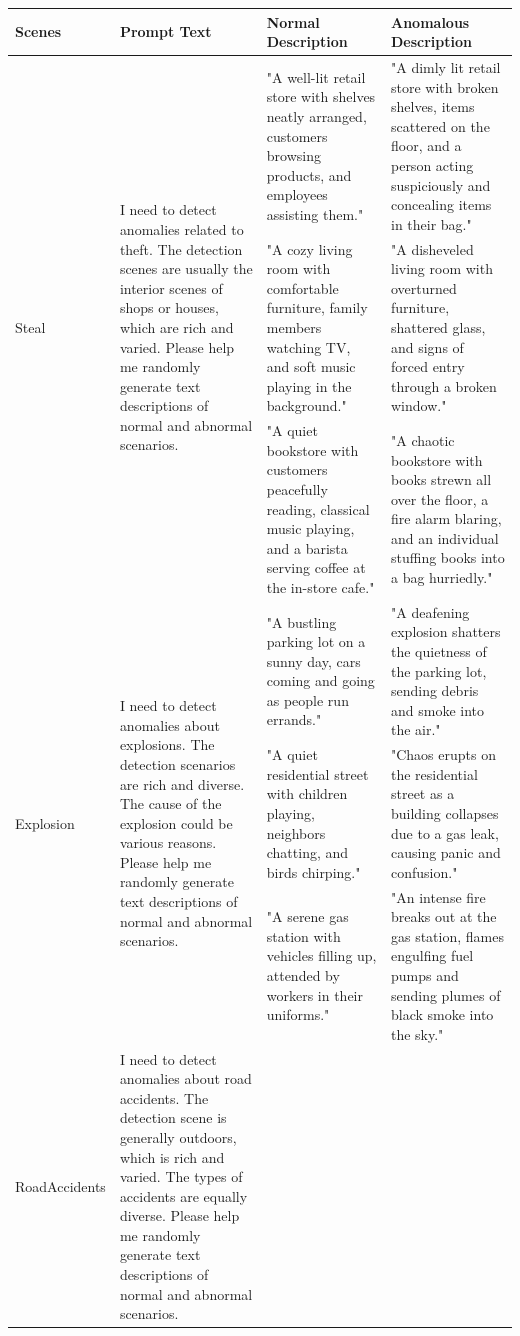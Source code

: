 \begin{table}[p]
\centering
\begin{tabularx}{\textwidth}{lXXX}
\hline
Scenes &
  Prompt Text &
  Normal Description &
  Anomalous Description \\ \hline
\multirow{3}{*}{Steal} &
  \multirow{3}{4.5cm}{I need to detect anomalies related to theft. The detection scenes are usually the interior scenes of shops or houses, which are rich and varied. Please help me randomly generate text descriptions of normal and abnormal scenarios.} &
  "A well-lit retail store with shelves neatly arranged, customers browsing products, and employees assisting them." &
  "A dimly lit retail store with broken shelves, items scattered on the floor, and a person acting suspiciously and concealing items in their bag." \\
 &
   &
  "A cozy living room with comfortable furniture, family members watching TV, and soft music playing in the background." &
  "A disheveled living room with overturned furniture, shattered glass, and signs of forced entry through a broken window." \\
 &
   &
  "A quiet bookstore with customers peacefully reading, classical music playing, and a barista serving coffee at the in-store cafe." &
  "A chaotic bookstore with books strewn all over the floor, a fire alarm blaring, and an individual stuffing books into a bag hurriedly." \\
  \hline
\multirow{3}{*}{Explosion} &
  \multirow{3}{4.5cm}{I need to detect anomalies about explosions. The detection scenarios are rich and diverse. The cause of the explosion could be various reasons. Please help me randomly generate text descriptions of normal and abnormal scenarios.} &
  "A bustling parking lot on a sunny day, cars coming and going as people run errands." &
  "A deafening explosion shatters the quietness of the parking lot, sending debris and smoke into the air." \\
 &
   &
  "A quiet residential street with children playing, neighbors chatting, and birds chirping." &
  "Chaos erupts on the residential street as a building collapses due to a gas leak, causing panic and confusion." \\
 &
   &
  "A serene gas station with vehicles filling up, attended by workers in their uniforms." &
  "An intense fire breaks out at the gas station, flames engulfing fuel pumps and sending plumes of black smoke into the sky." \\
  \hline
\multirow{3}{*}{RoadAccidents} &
  \multirow{3}{4.5cm}{I need to detect anomalies about road accidents. The detection scene is generally outdoors, which is rich and varied. The types of accidents are equally diverse. Please help me randomly generate text descriptions of normal and abnormal scenarios.} &

\end{tabularx}
\end{table}
